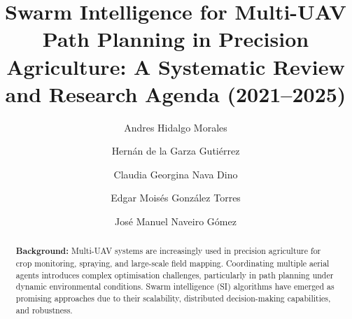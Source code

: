 \documentclass[review,3p,times]{elsarticle}
\begin{document}
\begin{frontmatter}
\title{Swarm Intelligence for Multi-UAV Path Planning in Precision Agriculture: A Systematic Review and Research Agenda (2021--2025)}

\author{\texorpdfstring{Andres Hidalgo Morales}{Andres Hidalgo Morales}}

\author{\texorpdfstring{Hernán de la Garza Gutiérrez}{Hernán de la Garza Gutiérrez}}

\author{\texorpdfstring{Claudia Georgina Nava Dino}{Claudia Georgina Nava Dino}}

\author{\texorpdfstring{Edgar Moisés González Torres}{Edgar Moisés González Torres}}

\author{\texorpdfstring{José Manuel Naveiro Gómez}{José Manuel Naveiro Gómez}}


\address[1]{Instituto Tecnológico de Chihuahua II, Tecnológico Nacional de México, Chihuahua, México}
\address[2]{Universidad Politécnica de Chihuahua, Chihuahua, México}
\address[3]{Facultad de Ingeniería, Universidad Autónoma de Chihuahua, Chihuahua, México}
\address[4]{Departamento de Ingeniería Mecánica, Universidad de Zaragoza, Zaragoza, España}

\begin{abstract}
\textbf{Background:} Multi-UAV systems are increasingly used in precision agriculture
for crop monitoring, spraying, and large-scale field mapping. Coordinating multiple
aerial agents introduces complex optimisation challenges, particularly in path planning
under dynamic environmental conditions. Swarm intelligence (SI) algorithms have
emerged as promising approaches due to their scalability, distributed decision-making
capabilities, and robustness.


\end{abstract}
\end{frontmatter}
\end{document}
